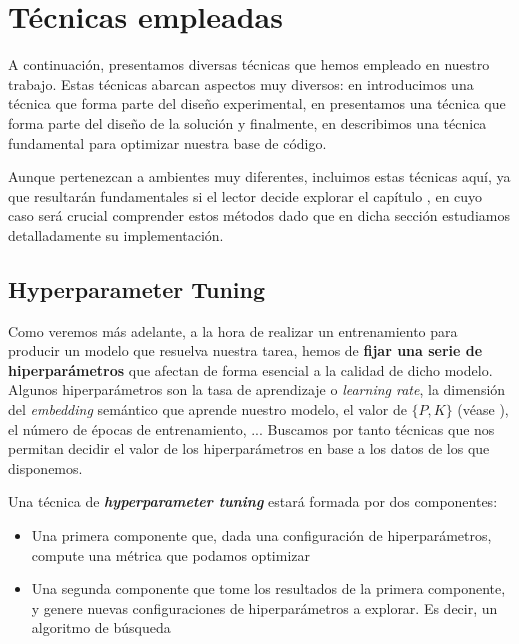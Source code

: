 \section{Técnicas empleadas}

A continuación, presentamos diversas técnicas que hemos empleado en nuestro trabajo. Estas técnicas abarcan aspectos muy diversos: en  introducimos una técnica que forma parte del diseño experimental, en  presentamos una técnica que forma parte del diseño de la solución y finalmente, en  describimos una técnica fundamental para optimizar nuestra base de código.

Aunque pertenezcan a ambientes muy diferentes, incluimos estas técnicas aquí, ya que resultarán fundamentales si el lector decide explorar el capítulo , en cuyo caso será crucial comprender estos métodos dado que en dicha sección estudiamos detalladamente su implementación.

\subsection{Hyperparameter Tuning} \label{isec:hptuning_kfold_cross_validation}

Como veremos más adelante, a la hora de realizar un entrenamiento para producir un modelo que resuelva nuestra tarea, hemos de \textbf{fijar una serie de hiperparámetros} que afectan de forma esencial a la calidad de dicho modelo. Algunos hiperparámetros son la tasa de aprendizaje o \textit{learning rate}, la dimensión del \textit{embedding} semántico que aprende nuestro modelo, el valor de $\{P, K\}$ (véase ), el número de épocas de entrenamiento, ... Buscamos por tanto técnicas que nos permitan decidir el valor de los hiperparámetros en base a los datos de los que disponemos.

Una técnica de \textbf{\textit{hyperparameter tuning}} estará formada por dos componentes:

\begin{itemize}
    \item Una primera componente que, dada una configuración de hiperparámetros, compute una métrica que podamos optimizar
    \item Una segunda componente que tome los resultados de la primera componente, y genere nuevas configuraciones de hiperparámetros a explorar. Es decir, un algoritmo de búsqueda
\end{itemize}

